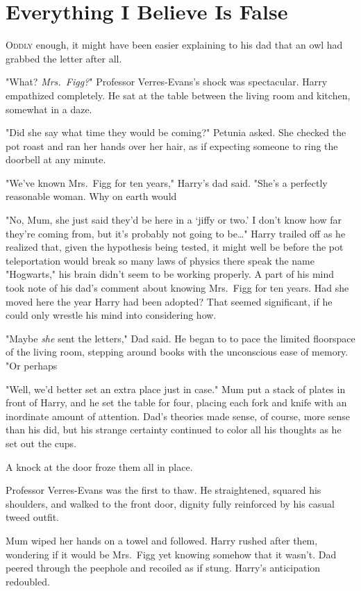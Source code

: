 \chapter{Everything I Believe Is False}

\lettrine{O}{ddly} enough, it might have been easier explaining to his
dad that an owl had grabbed the letter after all.

"What? \emph{Mrs.~Figg?}" Professor Verres-Evans's shock was
spectacular. Harry empathized completely. He sat at the
table between the living room and kitchen, somewhat in a daze.

"Did she say what time they would be coming?" Petunia
asked. She checked the pot roast and ran her hands over
her hair, as if expecting someone to ring the doorbell at any minute.

"We've known Mrs.~Figg for ten years," Harry's dad said.
"She's a perfectly reasonable woman. Why on earth would

"No, Mum, she just said they'd be here in a `jiffy or two.'
I don't know how far they're coming from, but it's probably not
going to be{\ldots}" Harry trailed off as he realized that, given
the hypothesis being tested, it might well be before the pot
teleportation would break so many laws of physics there
speak the name "Hogwarts," his brain
didn't seem to be working properly. A part of his mind
took note of his dad's comment about knowing Mrs.~Figg
for ten years. Had she moved here the year Harry had
been adopted? That seemed significant, if he could only
wrestle his mind into considering how.

"Maybe \emph{she} sent the letters," Dad said. He began to to
pace the limited floorspace of the living room, stepping
around books with the unconscious ease of memory. "Or perhaps

"Well, we'd better set an extra place just in case." Mum put a
stack of plates in front of Harry, and he set the table for
four, placing each fork and knife with an inordinate amount
of attention. Dad's theories made sense, of course, more
sense than his did, but his strange certainty continued to
color all his thoughts as he set out the cups.

A knock at the door froze them all in place.

Professor Verres-Evans was the first to thaw. He straightened, squared his
shoulders, and walked to the front door, dignity fully
reinforced by his casual tweed outfit.

Mum wiped her hands on a towel and followed. Harry
rushed after them, wondering if it would be Mrs.~Figg yet
knowing somehow that it wasn't. Dad peered through the
peephole and recoiled as if stung. Harry's anticipation redoubled.

